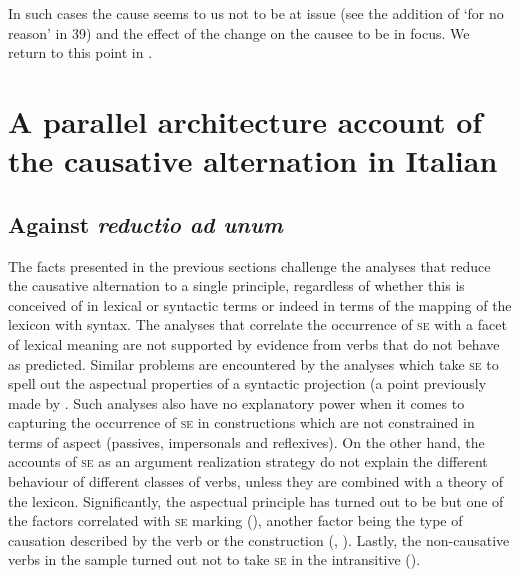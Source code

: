 \documentclass[output=paper,colorlinks,citecolor=brown
]{langscibook}
\begin{document}
In such cases the cause seems to us not to be at issue (see the addition of ‘for no reason’ in 39) and the effect of the change on the causee to be in focus. We return to this point in .

\section{A parallel architecture account of the causative alternation in Italian}
\label{bentley_section_5}

\subsection{Against \textit{reductio ad unum}}
\label{bentley_section_5.1}

The facts presented in the previous sections challenge the analyses that reduce the causative alternation to a single principle, regardless of whether this is conceived of in lexical or syntactic terms or indeed in terms of the mapping of the lexicon with syntax. The analyses that correlate the occurrence of \textsc{se} with a facet of lexical meaning are not supported by evidence from verbs that do not behave as predicted. Similar problems are encountered by the analyses which take \textsc{se} to spell out the aspectual properties of a syntactic projection (a point previously made by \cite[82--88]{alexiadou2015external}. Such analyses also have no explanatory power when it comes to capturing the occurrence of \textsc{se} in constructions which are not constrained in terms of aspect (passives, impersonals and reflexives). On the other hand, the accounts of \textsc{se} as an argument realization strategy do not explain the different behaviour of different classes of verbs, unless they are combined with a theory of the lexicon. Significantly, the aspectual principle has turned out to be but one of the factors correlated with \textsc{se} marking (), another factor being the type of causation described by the verb or the construction (, ). Lastly, the non-causative verbs in the sample turned out not to take \textsc{se} in the intransitive (). 
\end{document}
